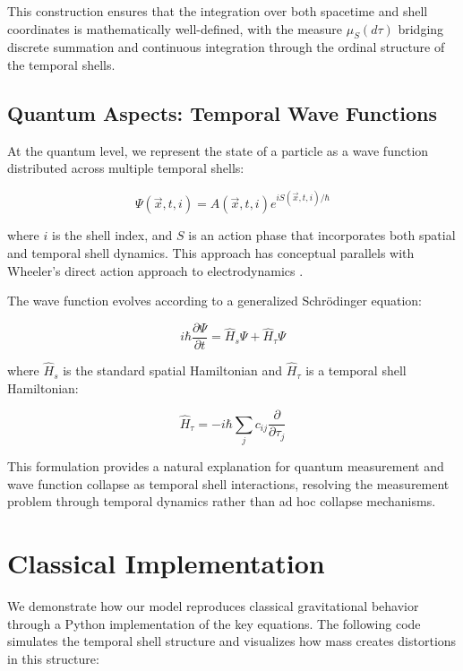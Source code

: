 \documentclass[12pt,a4paper]{article}
\begin{document}
This construction ensures that the integration over both spacetime and shell coordinates is mathematically well-defined, with the measure $\mu_S(d\tau)$ bridging discrete summation and continuous integration through the ordinal structure of the temporal shells.

\subsection{Quantum Aspects: Temporal Wave Functions}

At the quantum level, we represent the state of a particle as a wave function distributed across multiple temporal shells:

\begin{equation}
\Psi(\vec{x}, t, i) = A(\vec{x}, t, i) e^{iS(\vec{x}, t, i)/\hbar}
\end{equation}

where $i$ is the shell index, and $S$ is an action phase that incorporates both spatial and temporal shell dynamics. This approach has conceptual parallels with Wheeler's direct action approach to electrodynamics \citep{wheeler}.

The wave function evolves according to a generalized Schrödinger equation:

\begin{equation}
i\hbar \frac{\partial \Psi}{\partial t} = \hat{H}_s \Psi + \hat{H}_\tau \Psi
\end{equation}

where $\hat{H}_s$ is the standard spatial Hamiltonian and $\hat{H}_\tau$ is a temporal shell Hamiltonian:

\begin{equation}
\hat{H}_\tau = -i\hbar \sum_j c_{ij} \frac{\partial}{\partial \tau_j}
\end{equation}

This formulation provides a natural explanation for quantum measurement and wave function collapse as temporal shell interactions, resolving the measurement problem through temporal dynamics rather than ad hoc collapse mechanisms.

\section{Classical Implementation}

We demonstrate how our model reproduces classical gravitational behavior through a Python implementation of the key equations. The following code simulates the temporal shell structure and visualizes how mass creates distortions in this structure:
\end{document}
